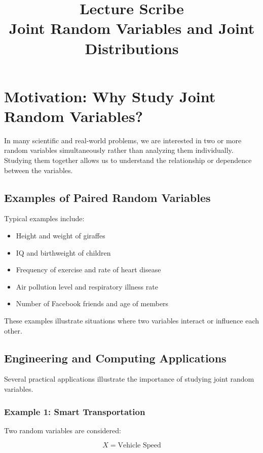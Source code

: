 \documentclass[12pt]{article}
\title{Lecture Scribe \\ Joint Random Variables and Joint Distributions}
\date{}
\begin{document}
\maketitle
\onehalfspacing

\section{Motivation: Why Study Joint Random Variables?}

In many scientific and real-world problems, we are interested in two or more random variables simultaneously rather than analyzing them individually. Studying them together allows us to understand the relationship or dependence between the variables.

\subsection*{Examples of Paired Random Variables}

Typical examples include:

\begin{itemize}
\item Height and weight of giraffes
\item IQ and birthweight of children
\item Frequency of exercise and rate of heart disease
\item Air pollution level and respiratory illness rate
\item Number of Facebook friends and age of members
\end{itemize}

These examples illustrate situations where two variables interact or influence each other.

\subsection*{Engineering and Computing Applications}

Several practical applications illustrate the importance of studying joint random variables.

\subsubsection*{Example 1: Smart Transportation}

Two random variables are considered:

\[
X = \text{Vehicle Speed}
\]
\end{document}
